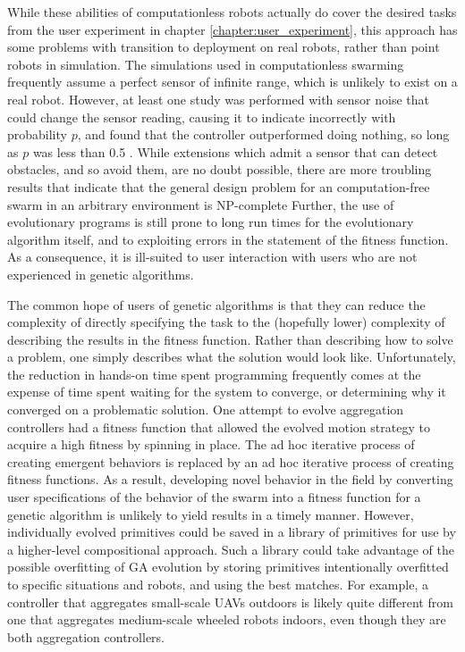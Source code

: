 While these abilities of computationless robots actually do cover the desired tasks from the user experiment in chapter \ref{chapter:user_experiment}, this approach has some problems with transition to deployment on real robots, rather than point robots in simulation. 
The simulations used in computationless swarming frequently assume a perfect sensor of infinite range, which is unlikely to exist on a real robot.
However, at least one study was performed with sensor noise that could change the sensor reading, causing it to indicate incorrectly with probability $p$, and found that the controller outperformed doing nothing, so long as $p$ was less than 0.5 \citep{gauci2014self}. 
While extensions which admit a sensor that can detect obstacles, and so avoid them, are no doubt possible, there are more troubling results that indicate that the general design problem for an computation-free swarm in an arbitrary environment is NP-complete \citep{wareham2018viable}
Further, the use of evolutionary programs is still prone to long run times for the evolutionary algorithm itself, and to exploiting errors in the statement of the fitness function. 
As a consequence, it is ill-suited to user interaction with users who are not experienced in genetic algorithms. 

The common hope of users of genetic algorithms is that they can reduce the complexity of directly specifying the task to the (hopefully lower) complexity of describing the results in the fitness function.
Rather than describing how to solve a problem, one simply describes what the solution would look like. 
Unfortunately, the reduction in hands-on time spent programming frequently comes at the expense of time spent waiting for the system to converge, or determining why it converged on a problematic solution. 
One attempt to evolve aggregation controllers had a fitness function that allowed the evolved motion strategy to acquire a high fitness by spinning in place.
The ad hoc iterative process of creating emergent behaviors is replaced by an ad hoc iterative process of creating fitness functions.
As a result, developing novel behavior in the field by converting user specifications of the behavior of the swarm into a fitness function for a genetic algorithm is unlikely to yield results in a timely manner. 
However, individually evolved primitives could be saved in a library of primitives for use by a higher-level compositional approach. 
Such a library could take advantage of the possible overfitting of GA evolution by storing primitives intentionally overfitted to specific situations and robots, and using the best matches. 
For example, a controller that aggregates small-scale UAVs outdoors is likely quite different from one that aggregates medium-scale wheeled robots indoors, even though they are both aggregation controllers. 


